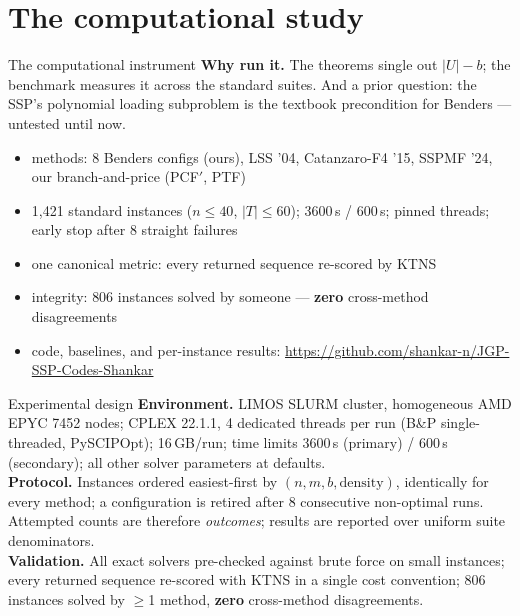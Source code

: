 \documentclass[10pt]{beamer}
\newcommand{\U}{U}\newcommand{\Kst}{K^{\ast}}\newcommand{\Zst}{Z^{\ast}}
\begin{document}
\section{The computational study}
\begin{frame}{The computational instrument}
\textbf{Why run it.} The theorems single out $|\U|-b$; the benchmark measures
it across the standard suites. And a prior question: the SSP's polynomial
loading subproblem is the textbook precondition for Benders --- untested until
now.
\vspace{1mm}
\begin{itemize}
  \item methods: 8 Benders configs (ours), LSS '04, Catanzaro-F4 '15,
        SSPMF '24, our branch-and-price (PCF$'$, PTF)
  \item 1{,}421 standard instances ($n\le40$, $|T|\le60$); 3600\,s / 600\,s;
        pinned threads; early stop after 8 straight failures
  \item one canonical metric: every returned sequence re-scored by KTNS
  \item integrity: $806$ instances solved by someone --- \textbf{zero}
        cross-method disagreements
  \item code, baselines, and per-instance results:
        {\scriptsize\url{https://github.com/shankar-n/JGP-SSP-Codes-Shankar}}
\end{itemize}
\end{frame}

\begin{frame}{Experimental design}
\textbf{Environment.} LIMOS SLURM cluster, homogeneous AMD EPYC 7452 nodes;
CPLEX 22.1.1, 4 dedicated threads per run (B\&P single-threaded, PySCIPOpt);
16\,GB/run; time limits 3600\,s (primary) / 600\,s (secondary); all other
solver parameters at defaults.\\[2mm]
\textbf{Protocol.} Instances ordered easiest-first by $(n,m,b,\text{density})$,
identically for every method; a configuration is retired after 8 consecutive
non-optimal runs. Attempted counts are therefore \emph{outcomes}; results are
reported over uniform suite denominators.\\[2mm]
\textbf{Validation.} All exact solvers pre-checked against brute force on
small instances; every returned sequence re-scored with KTNS in a single cost
convention; 806 instances solved by $\ge$1 method, \textbf{zero}
cross-method disagreements.
\end{frame}
\end{document}
